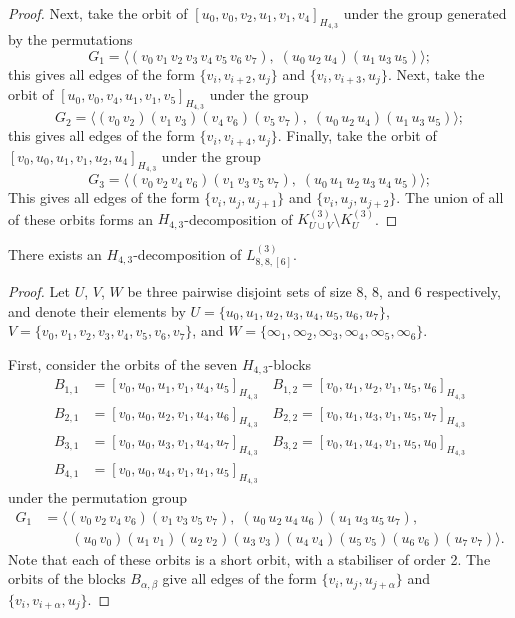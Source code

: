 \begin{subappendices}
\begin{proof}
Next, take the orbit of $[u_0, v_0, v_2, u_1, v_1, v_4]_{H_{4,3}}$ under the group generated by the permutations
\[
    G_1 = \langle (v_0 \, v_1 \, v_2 \, v_3 \, v_4 \, v_5 \, v_6 \, v_7),
    \; (u_0 \, u_2 \, u_4) (u_1 \, u_3 \, u_5) \rangle;
\]
this gives all edges of the form $\{v_i, v_{i+2}, u_j\}$ and $\{v_i, v_{i+3}, u_j\}$.
Next, take the orbit of $[u_0, v_0, v_4, u_1, v_1, v_5]_{H_{4,3}}$ under the group
\[
    G_2 = \langle (v_0 \, v_2) (v_1 \, v_3) (v_4 \, v_6) (v_5 \, v_7), \;
    (u_0 \, u_2 \, u_4) (u_1 \, u_3 \, u_5) \rangle;
\]
this gives all edges of the form $\{v_i, v_{i+4}, u_j\}$.
Finally, take the orbit of $[v_0, u_0, u_1, v_1, u_2, u_4]_{H_{4,3}}$ under the group
\[
    G_3 = \langle (v_0 \, v_2 \, v_4 \, v_6) (v_1 \, v_3 \, v_5 \, v_7), \;
    (u_0 \, u_1 \, u_2 \, u_3 \, u_4 \, u_5) \rangle;
\]
This gives all edges of the form $\{v_i, u_j, u_{j+1}\}$ and $\{v_i, u_j, u_{j+2}\}$.
The union of all of these orbits forms an $H_{4,3}$-decomposition of $K_{U \cup
V}^{(3)} \setminus K_{U}^{(3)}$.
\end{proof}


\begin{example} \label{eg:H_43-l88-k886}
There exists an $H_{4,3}$-decomposition of $L_{8,8,[6]}^{(3)}$.
\end{example}

\begin{proof}
Let $U$, $V$, $W$ be three pairwise disjoint sets of size 8, 8, and 6 respectively, and denote their elements by
  $U = \{u_0, u_1, u_2, u_3, u_4, u_5, u_6, u_7\}$,
  $V = \{v_0, v_1, v_2, v_3, v_4, v_5, v_6, v_7\}$, and
  $W = \{\infty_1, \infty_2, \infty_3, \infty_4, \infty_5, \infty_6\}$.

First, consider the orbits of the seven $H_{4,3}$-blocks
\begin{align*}
    B_{1,1} &= [v_0, u_0, u_1, v_1, u_4, u_5]_{H_{4,3}} \quad
    B_{1,2} = [v_0, u_1, u_2, v_1, u_5, u_6]_{H_{4,3}} \\
    B_{2,1} &= [v_0, u_0, u_2, v_1, u_4, u_6]_{H_{4,3}} \quad
    B_{2,2} = [v_0, u_1, u_3, v_1, u_5, u_7]_{H_{4,3}} \\
    B_{3,1} &= [v_0, u_0, u_3, v_1, u_4, u_7]_{H_{4,3}} \quad
    B_{3,2} = [v_0, u_1, u_4, v_1, u_5, u_0]_{H_{4,3}} \\
    B_{4,1} &= [v_0, u_0, u_4, v_1, u_1, u_5]_{H_{4,3}}
\end{align*}
under the permutation group
\begin{align*}
    G_1 &= \langle (v_0 \, v_2 \, v_4 \, v_6) (v_1 \, v_3 \, v_5 \, v_7),
    \; (u_0 \, u_2 \, u_4 \, u_6) (u_1 \, u_3 \, u_5 \, u_7), \\
    & \quad \quad (u_0 \, v_0) (u_1 \, v_1) (u_2 \, v_2) (u_3 \, v_3) (u_4 \, v_4)
    (u_5 \, v_5) (u_6 \, v_6) (u_7 \, v_7) \rangle.
\end{align*}
Note that each of these orbits is a short orbit, with a stabiliser of order 2.
The orbits of the blocks $B_{\alpha,\beta}$ give all edges of the form $\{v_i, u_j, u_{j+\alpha}\}$ and $\{v_i, v_{i+\alpha}, u_j\}$.


\end{proof}
\end{subappendices}
